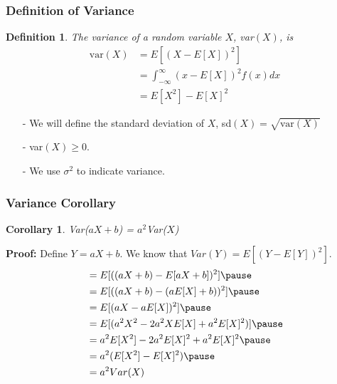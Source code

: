 \documentclass[aspectratio=169, handout]{beamer}
\newtheorem{defn}{Definition}
\newtheorem{cor}{Corollary}
\numberwithin{equation}{section}
\begin{document}
\begin{frame}
\frametitle{Definition of Variance}

\begin{defn}
The variance of a random variable $X$, var$(X)$, is 
\begin{align*}
 \text{var}(X) &= E[(X - E[X])^2]  \\
 &=  \int_{-\infty}^{\infty} (x - E[X])^2f(x) dx \\
 &=   E[X^2] - E[X]^2 \
\end{align*}
\end{defn}

\begin{itemize}
\item[-] We will define the standard deviation of $X$, sd$(X) = \sqrt{\text{var}(X)} $
\item[-] var$(X) \geq 0$.  
\item[-] We use $\sigma^2$ to indicate variance.
\end{itemize}


\end{frame}


\begin{frame}
\frametitle{Variance Corollary} 

\begin{cor}
Var($aX  + b$)  = $a^2$Var($X$) 
\end{cor} 
\pause 

\textbf{Proof:} Define $Y = aX +b$.  We know that $Var(Y) = E[(Y - E[Y])^2]$. \pause 
\begin{align*}
& = E[ ((aX + b) - E[a X + b])^2 ]   \pause \\
& = E[ ((aX + b) - (a E[X] + b))^2 ]   \pause \\
& = E[ (aX -a E[X] )^2 ]  \pause \\
& =  E[ (a^2 X^2 - 2 a^2 X E[X] + a^2 E[X]^2)]  \pause \\
& =  a^2E[X^2] -2a^2E[X]^2 + a^2 E[X]^2   \pause \\
& =  a^2(E[X^2] - E[X]^2) \pause  \\
& =  a^2 Var(X) 
 \end{align*}
\end{frame}
\end{document}
